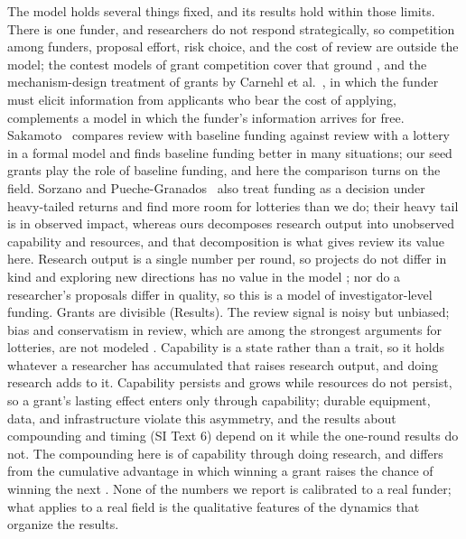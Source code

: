\documentclass[9pt,twocolumn,twoside]{pnas-new}
\begin{document}
The model holds several things fixed, and its results hold within those limits. There is one funder, and researchers do not respond strategically, so competition among funders, proposal effort, risk choice, and the cost of review are outside the model; the contest models of grant competition cover that ground \citep{GrossBergstrom2019, GrossBergstrom2025}, and the mechanism-design treatment of grants by Carnehl et al.~\cite{Carnehl2024}, in which the funder must elicit information from applicants who bear the cost of applying, complements a model in which the funder's information arrives for free. Sakamoto~\cite{Sakamoto2023} compares review with baseline funding against review with a lottery in a formal model and finds baseline funding better in many situations; our seed grants play the role of baseline funding, and here the comparison turns on the field. Sorzano and Pueche-Granados~\cite{Sorzano2026} also treat funding as a decision under heavy-tailed returns and find more room for lotteries than we do; their heavy tail is in observed impact, whereas ours decomposes research output into unobserved capability and resources, and that decomposition is what gives review its value here. Research output is a single number per round, so projects do not differ in kind and exploring new directions has no value in the model \citep{WeisbergMuldoon2009, AvinBJPS2019}; nor do a researcher's proposals differ in quality, so this is a model of investigator-level funding. Grants are divisible (Results). The review signal is noisy but unbiased; bias and conservatism in review, which are among the strongest arguments for lotteries, are not modeled \citep{Ginther2011, Witteman2019, Boudreau2016}. Capability is a state rather than a trait, so it holds whatever a researcher has accumulated that raises research output, and doing research adds to it. Capability persists and grows while resources do not persist, so a grant's lasting effect enters only through capability; durable equipment, data, and infrastructure violate this asymmetry, and the results about compounding and timing (SI Text 6) depend on it while the one-round results do not. The compounding here is of capability through doing research, and differs from the cumulative advantage in which winning a grant raises the chance of winning the next \citep{Merton1968, BolVaanRijt2018}. None of the numbers we report is calibrated to a real funder; what applies to a real field is the qualitative features of the dynamics that organize the results.
\end{document}
